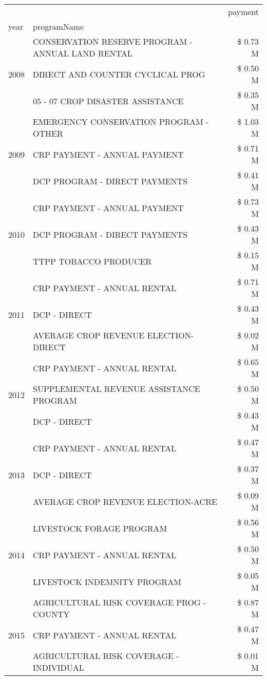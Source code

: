 \begin{tabular}{llr}
\toprule
 &  & payment \\
year & programName &  \\
\midrule
\multirow[t]{3}{*}{2008} & CONSERVATION RESERVE PROGRAM - ANNUAL LAND RENTAL & \$ 0.73 M \\
 & DIRECT AND COUNTER CYCLICAL PROG & \$ 0.50 M \\
 & 05 - 07 CROP DISASTER ASSISTANCE & \$ 0.35 M \\
\cline{1-3}
\multirow[t]{3}{*}{2009} & EMERGENCY CONSERVATION PROGRAM - OTHER & \$ 1.03 M \\
 & CRP PAYMENT - ANNUAL PAYMENT & \$ 0.71 M \\
 & DCP PROGRAM - DIRECT PAYMENTS & \$ 0.41 M \\
\cline{1-3}
\multirow[t]{3}{*}{2010} & CRP PAYMENT - ANNUAL PAYMENT & \$ 0.73 M \\
 & DCP PROGRAM - DIRECT PAYMENTS & \$ 0.43 M \\
 & TTPP TOBACCO PRODUCER & \$ 0.15 M \\
\cline{1-3}
\multirow[t]{3}{*}{2011} & CRP PAYMENT - ANNUAL RENTAL & \$ 0.71 M \\
 & DCP - DIRECT & \$ 0.43 M \\
 & AVERAGE CROP REVENUE ELECTION-DIRECT & \$ 0.02 M \\
\cline{1-3}
\multirow[t]{3}{*}{2012} & CRP PAYMENT - ANNUAL RENTAL & \$ 0.65 M \\
 & SUPPLEMENTAL REVENUE ASSISTANCE PROGRAM & \$ 0.50 M \\
 & DCP - DIRECT & \$ 0.43 M \\
\cline{1-3}
\multirow[t]{3}{*}{2013} & CRP PAYMENT - ANNUAL RENTAL & \$ 0.47 M \\
 & DCP - DIRECT & \$ 0.37 M \\
 & AVERAGE CROP REVENUE ELECTION-ACRE & \$ 0.09 M \\
\cline{1-3}
\multirow[t]{3}{*}{2014} & LIVESTOCK FORAGE PROGRAM & \$ 0.56 M \\
 & CRP PAYMENT - ANNUAL RENTAL & \$ 0.50 M \\
 & LIVESTOCK INDEMNITY PROGRAM & \$ 0.05 M \\
\cline{1-3}
\multirow[t]{3}{*}{2015} & AGRICULTURAL RISK COVERAGE PROG - COUNTY & \$ 0.87 M \\
 & CRP PAYMENT - ANNUAL RENTAL & \$ 0.47 M \\
 & AGRICULTURAL RISK COVERAGE - INDIVIDUAL & \$ 0.01 M \\
\cline{1-3}

\end{tabular}
